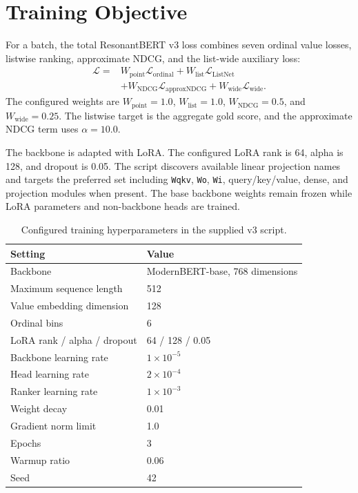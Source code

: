 \documentclass[11pt]{article}
\begin{document}
\section{Training Objective}

For a batch, the total ResonantBERT v3 loss combines seven ordinal value losses, listwise ranking, approximate NDCG, and the list-wide auxiliary loss:
\begin{equation}
\begin{split}
\mathcal{L} ={}& W_{\mathrm{point}}\mathcal{L}_{\mathrm{ordinal}}
 + W_{\mathrm{list}}\mathcal{L}_{\mathrm{ListNet}} \\
&+ W_{\mathrm{NDCG}}\mathcal{L}_{\mathrm{approxNDCG}}
 + W_{\mathrm{wide}}\mathcal{L}_{\mathrm{wide}}.
\end{split}
\end{equation}
The configured weights are $W_{\mathrm{point}}=1.0$, $W_{\mathrm{list}}=1.0$, $W_{\mathrm{NDCG}}=0.5$, and $W_{\mathrm{wide}}=0.25$. The listwise target is the aggregate gold score, and the approximate NDCG term uses $\alpha=10.0$.

The backbone is adapted with LoRA. The configured LoRA rank is 64, alpha is 128, and dropout is 0.05. The script discovers available linear projection names and targets the preferred set including \texttt{Wqkv}, \texttt{Wo}, \texttt{Wi}, query/key/value, dense, and projection modules when present. The base backbone weights remain frozen while LoRA parameters and non-backbone heads are trained.

\begin{table}[t]
\centering
\small
\begin{tabular}{ll}
\toprule
\textbf{Setting} & \textbf{Value} \\
\midrule
Backbone & ModernBERT-base, 768 dimensions \\
Maximum sequence length & 512 \\
Value embedding dimension & 128 \\
Ordinal bins & 6 \\
LoRA rank / alpha / dropout & 64 / 128 / 0.05 \\
Backbone learning rate & $1\times10^{-5}$ \\
Head learning rate & $2\times10^{-4}$ \\
Ranker learning rate & $1\times10^{-3}$ \\
Weight decay & 0.01 \\
Gradient norm limit & 1.0 \\
Epochs & 3 \\
Warmup ratio & 0.06 \\
Seed & 42 \\
\bottomrule
\end{tabular}
\caption{Configured training hyperparameters in the supplied v3 script.}
\label{tab:hyperparameters}
\end{table}
\end{document}
